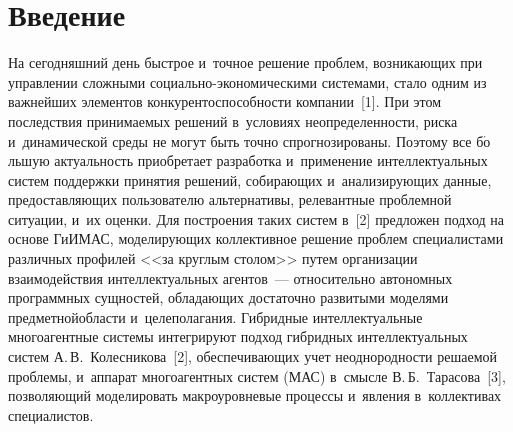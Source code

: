 
  
\vspace*{-3pt}



\thispagestyle{headings}

\begin{multicols}{2}

\label{st\stat}

\section{Введение}

\vspace*{-3pt}

  На сегодняшний день быстрое и~точное решение проблем, возникающих при 
управлении сложными со\-ци\-аль\-но-эко\-но\-ми\-че\-ски\-ми сис\-те\-ма\-ми, 
стало одним из важнейших элементов конкурентоспособности компании~[1]. 
При этом последствия принимаемых решений в~условиях неопределенности, 
риска и~динамической среды не могут быть точно спрогнозированы. Поэтому 
все б$\acute{\mbox{о}}$льшую актуальность приобретает разработка 
и~применение интеллектуальных сис\-тем поддержки принятия решений, 
собирающих и~анализирующих данные, предос\-тав\-ля\-ющих пользователю 
альтернативы, релевантные проб\-лем\-ной ситуации, и~их оценки. Для 
по\-стро\-ения таких систем в~[2] предложен подход на основе \mbox{ГиИМАС}, мо\-де\-ли\-ру\-ющих 
коллективное решение проб\-лем специалистами различных профилей <<за 
круглым столом>> путем организации взаимодействия интеллектуальных 
агентов~--- относительно автономных программных сущностей, об\-ла\-да\-ющих 
достаточно развитыми моделями предметной\linebreak об\-ласти и~целеполагания. 
Гибридные интеллектуальные многоагентные сис\-те\-мы 
интегрируют подход гиб\-рид\-ных интеллектуальных сис\-тем 
А.\,В.~Колесникова~[2], обеспечивающих учет \mbox{неоднородности} решаемой 
проблемы, и~аппарат многоагентных сис\-тем (МАС) в~смысле В.\,Б.~Тарасова~[3], 
поз\-во\-ля\-ющий моделировать макроуровневые процессы и~явления 
в~коллективах спе\-ци\-а\-ли\-стов. 
  

\end{multicols}
